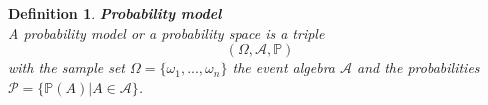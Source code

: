 \documentclass[twoside]{article}
\newtheorem{definition}[theorem]{Definition}
\begin{document}
\begin{definition} \textbf{Probability model}\\
A probability model or a probability space is a triple
\begin{equation*}
    (\Omega, \mathcal{A}, \mathbb{P})
\end{equation*}
with the sample set $\Omega = \{\omega_1,...,\omega_n\}$ the event algebra $\mathcal{A}$ and the probabilities $\mathcal{P} = \{\mathbb{P}(A) | A \in \mathcal{A}\}$.
\end{definition}
\end{document}
